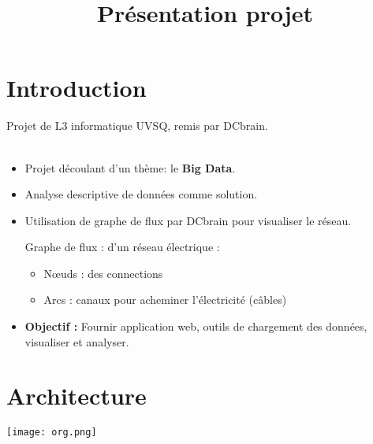 
\usepackage{../tex/myInfolines}
\usepackage{longtable,array}
\title{Présentation projet}



	\begin{frame}
		\titlepage
	\end{frame}
	
	\section*{Introduction}
		\begin{frame}
			Projet de L3 informatique UVSQ, remis par DCbrain.\\~\\
		\begin{itemize}
		\item Projet découlant d'un thème: le \textbf{Big Data}.
		\item Analyse descriptive de données comme solution.
		\item Utilisation de graphe de flux par DCbrain pour visualiser le réseau.\vspace{1em}
		\pause
		\begin{exampleblock}{Graphe de flux : d'un réseau électrique :}
		\begin{itemize}
		\item Nœuds : des connections
		\item Arcs : canaux pour acheminer l'électricité (câbles)
		\end{itemize}
		\end{exampleblock}
		\vspace{1em}
		\item \textbf{Objectif :} Fournir application web, outils de chargement des données, visualiser et analyser.
		\end{itemize}
		\end{frame}
	
	\begin{frame}
		\tableofcontents
	\end{frame}
	
	\section{Architecture}
	\begin{frame}
		\begin{center}\texttt{[image: org.png]}\end{center}
	\end{frame}		
	
